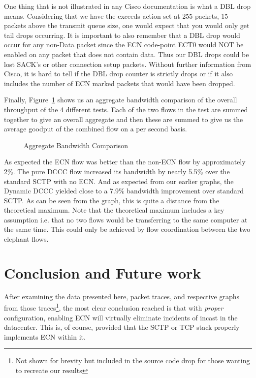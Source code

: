 \documentclass[12pt]{article}
\begin{document}
One thing that is not illustrated in any Cisco documentation is what a DBL drop means. Considering
that we have the exceeds action set at 255 packets, 15 packets above the transmit queue size, one
would expect that you would only get tail drops occurring.  It is important to also remember that a DBL 
drop would occur for any non-Data packet since the ECN code-point ECT0 would NOT be enabled on any packet that
does not contain data. Thus our DBL drops could be lost SACK's or other connection setup packets.
Without further information from Cisco, it is hard to tell if the DBL drop counter is strictly drops or
if it also includes the number of ECN marked packets that would have been dropped.


Finally, Figure~\ref{fig:aggBw}  shows us an aggregate bandwidth comparison of the 
overall throughput of the 4 different tests. Each of the two flows in the test are summed
together to give an overall aggregate and then these are summed to give us the average
goodput of the combined flow on a per second basis. 

\begin{figure}[h]
\centering
{}
\caption{Aggregate Bandwidth Comparison}
\label{fig:aggBw}
\end{figure}

As expected the ECN flow was better than the non-ECN flow by approximately 2\%. The
pure DCCC flow increased its bandwidth by nearly 5.5\% over the standard SCTP with no ECN.
And as expected from our earlier graphs, the Dynamic DCCC yielded close to a 7.9\% bandwidth
improvement over standard SCTP. As can be seen from the graph, this is quite a distance from the
theoretical maximum. Note that the theoretical maximum includes a key assumption i.e. that 
no two flows would be transferring to the same computer at the same time. This could only
be achieved by flow coordination between the two elephant flows.

\section{Conclusion and Future work}

After examining the data presented here, packet traces, and respective
graphs from those traces\footnote{Not shown for brevity but included in the source
code drop for those wanting to recreate our results}, the most clear conclusion reached is that 
with \emph{proper} configuration, enabling ECN will virtually eliminate incidents of
incast in the datacenter. This is, of course, provided that the SCTP or
TCP stack properly implements ECN within it. 
\\
\end{document}
